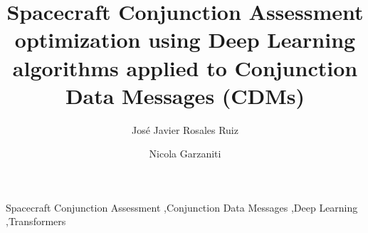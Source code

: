 \documentclass[3p, twocolumn]{elsarticle}
\begin{document}
\begin{frontmatter}

\title{Spacecraft Conjunction Assessment optimization using Deep Learning algorithms applied to Conjunction Data Messages (CDMs)} 



\author{José Javier Rosales Ruiz } %


\author{Nicola Garzaniti} 
            


\begin{abstract}

\end{abstract}

\begin{keyword}
Spacecraft Conjunction Assessment \sep Conjunction Data Messages \sep Deep Learning \sep Transformers
\end{keyword}

\end{frontmatter}

\linenumbers
\end{document}

